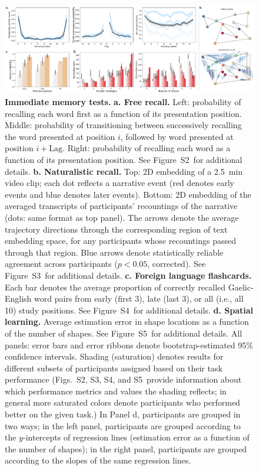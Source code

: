 \documentclass[10pt]{article}
\newcommand{\frDetail}{S2}
\newcommand{\natDetail}{S3}
\newcommand{\vocabDetail}{S4}
\newcommand{\spatialDetail}{S5}
\begin{document}
\begin{figure}[tp]
\centering
\includegraphics[width=1\textwidth]{figs/behavior_overview_immediate}
\caption{\textbf{Immediate memory tests.}  \textbf{a. Free recall.}
  Left: probability of recalling each word first as a function of its
  presentation position.  Middle: probability of transitioning between
successively recalling the word presented at position $i$, followed by
word presented at position $i + \mathrm{Lag}$.  Right: probability of
recalling each word as a function of its presentation position.  See
Figure~\frDetail~for additional details.
\textbf{b. Naturalistic recall.}  Top: 2D embedding of a 2.5~min video
clip; each dot reflects a narrative event (red denotes early events
and blue denotes later events).  Bottom: 2D embedding of the averaged
transcripts of participants' recountings of the narrative (dots: same
format as top panel).  The arrows denote the average trajectory
directions through the corresponding region of text embedding space,
for any participants whose recountings passed through that region.
Blue arrows denote statistically reliable agreement across
participants ($p < 0.05$, corrected).  See Figure~\natDetail~for
additional details.  \textbf{c. Foreign language
  flashcards.} Each bar denotes the average proportion of correctly
recalled Gaelic-English word pairs from early (first 3), late (last
3), or all (i.e., all 10) study positions.  See
Figure~\vocabDetail~for additional details.  \textbf{d. Spatial
  learning.}  Average estimation error in shape locations as a
function of the number of shapes.  See Figure~\spatialDetail~for
additional details.  All panels: error bars and error
ribbons denote bootstrap-estimated 95\% confidence intervals.  Shading
(saturation) denotes results for different subsets of participants
assigned based on their task performance (Figs.~\frDetail,
\natDetail, \vocabDetail, and \spatialDetail~provide information about
which performance metrics and values the shading reflects; in general
more saturated colors denote participants who performed better on the
given task.)  In Panel d, participants are grouped in two ways; in the
left panel, participants are grouped according to the $y$-intercepts of regression lines (estimation error as a
function of the number of shapes); in the right panel, participants
are grouped according to the slopes of the same regression lines.}
\label{fig:immediate_behavior}
\end{figure}
\end{document}
